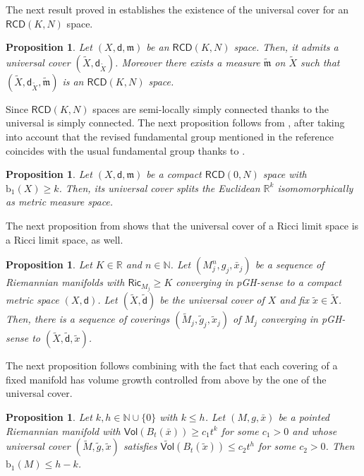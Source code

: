 \documentclass[10pt]{article}
\newtheorem{proposition}[thm]{Proposition}
\theoremstyle{definition}
\newcommand{\bb}[1]{\mathbb{#1}}
\newcommand{\ssf}[1]{\mathsf{#1}}
\newcommand{\Ric}{\mathsf{Ric}}
\newcommand{\RCD}{\mathsf{RCD}}
\newcommand{\sd}{\mathsf{d}}
\newcommand{\m}{\mathfrak{m}}
\begin{document}
The next result proved in \cite{MondinoWei}  establishes the existence of the universal cover for an $\RCD(K,N)$ space.  

\begin{proposition}
    Let $(X,\sd,\m)$ be an $\RCD(K,N)$ space. Then, it admits a universal cover $(\tilde{X},\sd_{\tilde{X}})$. Moreover there exists a measure $\tilde{\m}$ on $\tilde{X}$ such that $(\tilde{X},\sd_{\tilde{X}}, \tilde{\m})$ is an $\RCD(K,N)$ space.
\end{proposition}


Since $\RCD(K,N)$ spaces are semi-locally simply connected thanks to \cite{RCDsemilocally} the universal is simply connected. The next proposition follows from \cite[Theorem 1.3]{MondinoWei}, after taking into account that the revised fundamental group mentioned in the reference coincides with the usual fundamental group thanks to \cite{RCDsemilocally}. 


\begin{proposition} \label{P|splitting universal cover}
    Let $(X,\sd,\m)$ be a compact $\RCD(0,N)$ space with $\mathrm{b}_1(X) \geq k$. Then, its universal cover splits the Euclidean  $\bb{R}^k$ isomomorphically as metric measure space.
\end{proposition}

The next proposition from \cite[Corollary 4.11]{Sormaniwei} shows that the universal cover of a Ricci limit space is a Ricci limit space, as well.

\begin{proposition} \label{P|convergence coverings}
    Let $K \in \bb{R}$ and $n \in \bb{N}$. Let $(M_j^n,g_j, \bar{x}_j)$ be a sequence of Riemannian manifolds with $\Ric_{M_j} \geq K$ converging in pGH-sense to a compact metric space $(X,\sd)$. Let $(\tilde{X},\tilde{\sd})$ be the universal cover of $X$ and fix $\tilde{x} \in \tilde{X}$.    
    Then, there is a sequence of coverings $(\tilde{M}_j,\tilde{g}_j, \tilde{x}_j)$ of $M_j$ converging in pGH-sense to $(\tilde{X},\tilde{\sd},\tilde{x})$.
\end{proposition}

The next proposition follows combining \cite[Theorems $1.1$ and $1.3$]{Anderson} with the fact that each covering of a fixed manifold has volume growth controlled from above by the one  of the universal cover. 

\begin{proposition} \label{P|anderson}
    Let $k,h \in \bb{N} \cup \{0\}$ with $k \leq h$. Let $(M,g,\bar{x})$ be a pointed Riemannian manifold with $\ssf{Vol}(B_t(\bar{x})) \geq c_1 t^k$ for some $c_1>0$ and whose universal cover $(\tilde{M},\tilde{g},\tilde{x})$ satisfies $\widetilde{\ssf{Vol}}(B_t(\tilde{x})) \leq c_2 t^h$ for some $c_2>0$. Then $\mathrm{b}_1(M) \leq h-k$.
\end{proposition}
\end{document}
